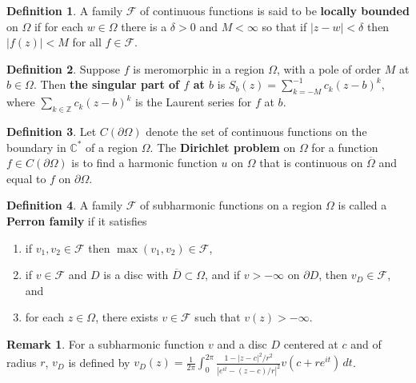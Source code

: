 \documentclass[12pt]{article}
\theoremstyle{definition}
\newtheorem{definition}{Definition}
\newtheorem*{remark}{Remark}
\newcommand{\Z}{\mathbb{Z}}
\newcommand{\C}{\mathbb{C}}    %
\begin{document}
\begin{definition}
    A family $\mathcal{F}$ of continuous functions is said to be \textbf{locally bounded} on $\Omega$ if for each $w\in\Omega$ there is a $\delta>0$ and $M<\infty$ so that if $|z-w|<\delta$ then $|f(z)|<M$ for all $f\in\mathcal{F}$.
\end{definition}

\begin{definition}
    Suppose $f$ is meromorphic in a region $\Omega$, with a pole of order $M$ at $b\in\Omega$. Then \textbf{the singular part of $f$ at $b$} is $S_b(z)=\sum_{k=-M}^{-1}c_k(z-b)^k$, where $\sum_{k\in\Z} c_k(z-b)^k$ is the Laurent series for $f$ at $b$.
\end{definition}

\begin{definition}
    Let $C(\partial\Omega)$ denote the set of continuous functions on the boundary in $\C^*$ of a region $\Omega$. The \textbf{Dirichlet problem} on ${\Omega}$ for a function $f\in C(\partial\Omega)$ is to find a harmonic function $u$ on $\Omega$ that is continuous on $\overline{\Omega}$ and equal to $f$ on $\partial \Omega$. 
\end{definition}

\begin{definition}
    A family $\mathcal{F}$ of subharmonic functions on a region $\Omega$ is called a \textbf{Perron family} if it satisfies
    \begin{enumerate}[label=(\roman*)]
        \item if $v_1,v_2\in\mathcal{F}$ then $\max(v_1,v_2)\in\mathcal{F}$,
        \item if $v\in\mathcal{F}$ and $D$ is a disc with $\overline{D}\subset\Omega$, and if $v>-\infty$ on $\partial D$, then $v_D\in\mathcal{F}$, and
        \item for each $z\in\Omega$, there exists $v\in\mathcal{F}$ such that $v(z)>-\infty$.
    \end{enumerate}
\end{definition}
\begin{remark}
    For a subharmonic function $v$ and a disc $D$ centered at $c$ and of radius $r$, $v_D$ is defined by $v_D(z)=\frac{1}{2\pi}\int_0^{2\pi}\frac{1-|z-c|^2/r^2}{|e^{it}-(z-c)/r|^2}v(c+re^{it})\,dt$.
\end{remark}
\end{document}
